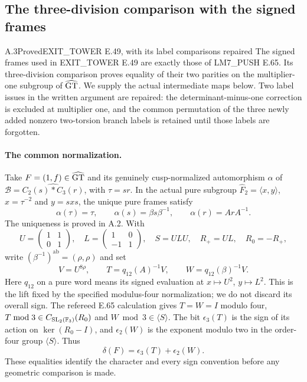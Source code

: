 \subsection{The three-division comparison with the signed frames}

\begin{result}{A.3}{Proved}{EXIT\_TOWER E.49, with its label comparisons repaired}
The signed frames used in EXIT\_TOWER E.49 are exactly those of LM7\_PUSH E.65. Its three-division comparison proves equality of their two parities on the multiplier-one subgroup of $\widehat{\mathrm{GT}}$. We supply the actual intermediate maps below. Two label issues in the written argument are repaired: the determinant-minus-one correction is excluded at multiplier one, and the common permutation of the three newly added nonzero two-torsion branch labels is retained until those labels are forgotten.
\end{result}

\paragraph{The common normalization.}
Take $F=(1,f)\in\widehat{\mathrm{GT}}$ and its genuinely cusp-normalized automorphism
$\alpha$ of $\mathcal B=\widehat{C_2(s)*C_3(r)}$, with $\tau=sr$.
In the actual pure subgroup $\widehat F_2=\langle x,y\rangle$,
$x=\tau^{-2}$ and $y=sxs$, the unique pure frames satisfy
\[
 \alpha(\tau)=\tau,\qquad
 \alpha(s)=\beta s\beta^{-1},\qquad
 \alpha(r)=ArA^{-1}.
 \tag{A.C1}
\]
The uniqueness is proved in A.2. With
\[
 U=\begin{pmatrix}1&1\\0&1\end{pmatrix},\quad
 L=\begin{pmatrix}1&0\\-1&1\end{pmatrix},\quad
 S=ULU,\quad R_+=UL,\quad R_0=-R_+,
\]
write $(\beta^{-1})^{\mathrm{ab}}=(\rho,\rho)$ and set
\[
 V=U^{8\rho},\qquad
 T=q_{12}(A)^{-1}V,\qquad W=q_{12}(\beta)^{-1}V.
 \tag{A.C2}
\]
Here $q_{12}$ on a pure word means its signed evaluation at
$x\mapsto U^2$, $y\mapsto L^2$. This is the lift fixed by the
specified modulus-four normalization; we do not discard its overall
sign. The refereed E.65 calculation gives $T=W=I$ modulo four,
$T\bmod3\in C_{\operatorname{SL}_2(\mathbb F_3)}(R_0)$ and
$W\bmod3\in\langle S\rangle$.
The bit $\epsilon_3(T)$ is the sign of its action on
$\ker(R_0-I)$, and $\epsilon_2(W)$ is the exponent modulo two in
the order-four group $\langle S\rangle$. Thus
\[
                  \delta(F)=\epsilon_3(T)+\epsilon_2(W).
 \tag{A.C3}
\]
These equalities identify the character and every sign convention
before any geometric comparison is made.

